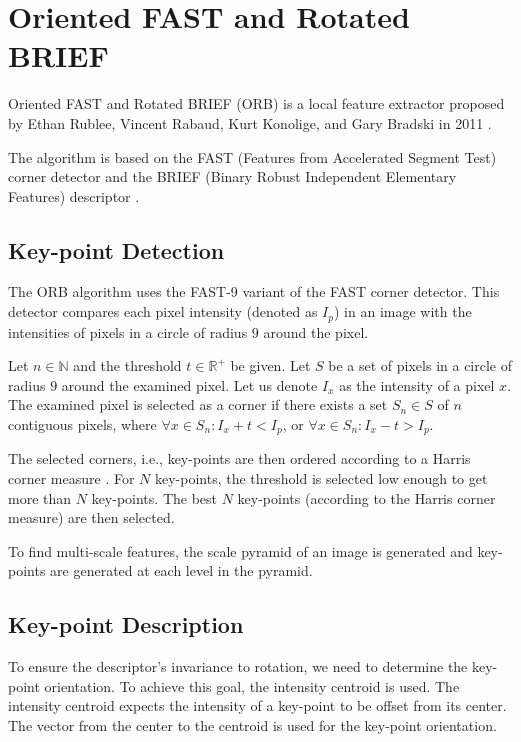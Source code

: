 \section{Oriented FAST and Rotated BRIEF}
Oriented FAST and Rotated BRIEF (ORB) is a local feature extractor proposed by Ethan Rublee, Vincent Rabaud, Kurt Konolige, and Gary Bradski in 2011 \cite{Rublee2011}.

The algorithm is based on the FAST (Features from Accelerated Segment Test) corner detector \cite{Rosten2006} and the BRIEF (Binary Robust Independent Elementary Features) descriptor \cite{Calonder2010}.

\subsection{Key-point Detection}
The ORB algorithm uses the FAST-9 variant of the FAST corner detector. This detector compares each pixel intensity (denoted as $I_p$) in an image with the intensities of pixels in a circle of radius $9$ around the pixel.

Let $n\in\mathbb{N}$ and the threshold $t\in\mathbb{R}^{+}$ be given. Let $S$ be a set of pixels in a circle of radius $9$ around the examined pixel. Let us denote $I_x$ as the intensity of a pixel $x$. The examined pixel is selected as a corner if there exists a set $S_n \in S$ of $n$ contiguous pixels, where $\forall x \in S_n: I_x + t < I_p$, or $\forall x \in S_n: I_x - t > I_p$.

The selected corners, i.e., key-points are then ordered according to a Harris corner measure \cite{Harris1988}. For $N$ key-points, the threshold is selected low enough to get more than $N$ key-points. The best $N$ key-points (according to the Harris corner measure) are then selected.

To find multi-scale features, the scale pyramid of an image is generated and key-points are generated at each level in the pyramid.

\subsection{Key-point Description}
To ensure the descriptor's invariance to rotation, we need to determine the key-point orientation. To achieve this goal, the intensity centroid \cite{Rosin1999} is used. The intensity centroid expects the intensity of a key-point to be offset from its center. The vector from the center to the centroid is used for the key-point orientation.

